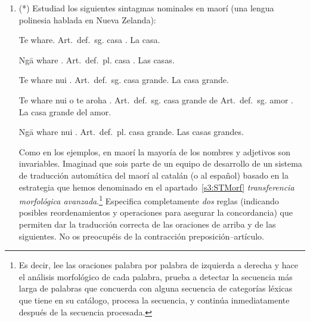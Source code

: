 \begin{enumerate}
\item (*) Estudiad los siguientes sintagmas nominales en maorí (una lengua polinesia hablada en Nueva Zelanda): 

\begin{example} \gll Te whare. \textsf{Art.\ def.\ sg.} casa . \glt La casa. \glend

\end{example} 

\begin{example} \gll Ng\={a} whare . \textsf{Art.\ def.\ pl.} casa . \glt Las casas. \glend

\end{example} 

\begin{example} \gll Te whare nui . \textsf{Art.\ def.\ sg.} casa grande. \glt La casa grande. \glend

\end{example} 

\begin{example} \gll Te whare nui o te aroha . \textsf{Art.\ def.\ sg.} casa grande de \textsf{Art.\ def.\ sg.} amor . \glt La casa grande del amor. \glend

\end{example} 

\begin{example} \gll Ng\={a} whare nui . \textsf{Art.\ def.\ pl.} casa grande. \glt Las casas grandes. \glend

\end{example} 

Como en los ejemplos, en maorí la mayoría de los nombres y adjetivos son invariables. Imaginad que sois parte de un equipo de desarrollo de un sistema de traducción automática del maorí al catalán (o al español) basado en la estrategia que hemos denominado en el apartado~\ref{s3:STMorf} \emph{transferencia morfológica avanzada}.\footnote{Es decir, lee las oraciones palabra por palabra de izquierda a derecha y hace el análisis morfológico de cada palabra, prueba a detectar la secuencia más larga de palabras que concuerda con alguna secuencia de categorías léxicas que tiene en su catálogo, procesa la secuencia, y continúa inmediatamente después de la secuencia procesada.} Especifica completamente \emph{dos} reglas (indicando posibles reordenamientos y operaciones para asegurar la concordancia) que permiten dar la traducción correcta de las oraciones de arriba y de las siguientes. No os preocupéis de la contracción preposición--artículo. 


\end{enumerate}
